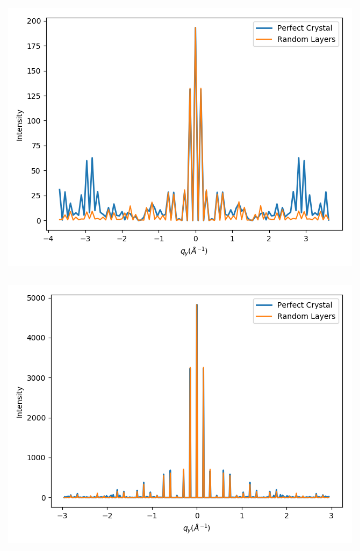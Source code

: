 \documentclass{article}
\begin{document}
  \begin{figure}[!htb]
  \centering
  \begin{subfigure}{0.3\textwidth}
  \includegraphics[width=\textwidth]{perfect_v_random_layers.png} 
  \caption{}\label{fig:perfect_v_random_layers}
  \end{subfigure}
  \begin{subfigure}{0.3\textwidth}
  \includegraphics[width=\textwidth]{perfect_v_random_100pores.png} 
  \caption{}\label{fig:perfect_v_random_100pores}
  \end{subfigure}
  \begin{subfigure}{0.3\textwidth}

\end{subfigure}
\end{figure}
\end{document}
